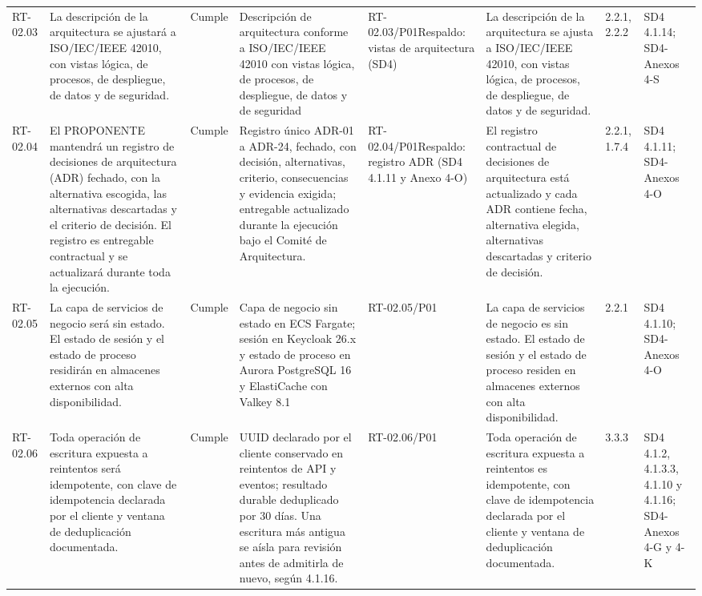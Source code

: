 \documentclass[oficio,firma,final]{lafrox}
\begin{document}
\begin{landscape}
{\begin{longtable}{@{}F{0.054} F{0.173} F{0.061} F{0.191} F{0.106} F{0.180} F{0.067} F{0.168}@{}}
  RT-02.03 & La descripción de la arquitectura se ajustará a ISO/IEC/IEEE 42010, con vistas lógica, de procesos, de despliegue, de datos y de seguridad. & Cumple & Descripción de arquitectura conforme a ISO/IEC/IEEE 42010 con vistas lógica, de procesos, de despliegue, de datos y de seguridad & RT-02.03/\allowbreak{}P01\newline Respaldo: vistas de arquitectura (SD4) & La descripción de la arquitectura se ajusta a ISO/IEC/IEEE 42010, con vistas lógica, de procesos, de despliegue, de datos y de seguridad. & 2.2.1, 2.2.2 & SD4 4.1.14; SD4-Anexos 4-S  \\
  RT-02.04 & El PROPONENTE mantendrá un registro de decisiones de arquitectura (ADR) fechado, con la alternativa escogida, las alternativas descartadas y el criterio de decisión. El registro es entregable contractual y se actualizará durante toda la ejecución. & Cumple & Registro único ADR-01 a ADR-24, fechado, con decisión, alternativas, criterio, consecuencias y evidencia exigida; entregable actualizado durante la ejecución bajo el Comité de Arquitectura. & RT-02.04/\allowbreak{}P01\newline Respaldo: registro ADR (SD4 4.1.11 y Anexo 4-O) & El registro contractual de decisiones de arquitectura está actualizado y cada ADR contiene fecha, alternativa elegida, alternativas descartadas y criterio de decisión. & 2.2.1, 1.7.4 & SD4 4.1.11; SD4-Anexos 4-O  \\
  RT-02.05 & La capa de servicios de negocio será sin estado. El estado de sesión y el estado de proceso residirán en almacenes externos con alta disponibilidad. & Cumple & Capa de negocio sin estado en ECS Fargate; sesión en Keycloak 26.x y estado de proceso en Aurora PostgreSQL 16 y ElastiCache con Valkey 8.1 & RT-02.05/\allowbreak{}P01 & La capa de servicios de negocio es sin estado. El estado de sesión y el estado de proceso residen en almacenes externos con alta disponibilidad. & 2.2.1 & SD4 4.1.10; SD4-Anexos 4-O  \\
  RT-02.06 & Toda operación de escritura expuesta a reintentos será idempotente, con clave de idempotencia declarada por el cliente y ventana de deduplicación documentada. & Cumple & UUID declarado por el cliente conservado en reintentos de API y eventos; resultado durable deduplicado por 30 días. Una escritura más antigua se aísla para revisión antes de admitirla de nuevo, según 4.1.16. & RT-02.06/\allowbreak{}P01 & Toda operación de escritura expuesta a reintentos es idempotente, con clave de idempotencia declarada por el cliente y ventana de deduplicación documentada. & 3.3.3 & SD4 4.1.2, 4.1.3.3, 4.1.10 y 4.1.16; SD4-Anexos 4-G y 4-K  \\

\end{longtable}}
\end{landscape}
\end{document}
